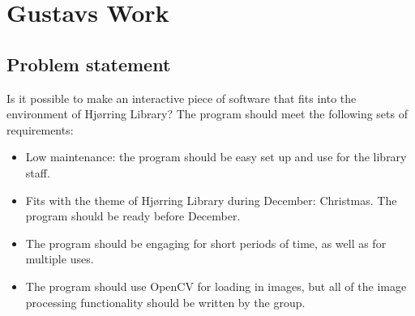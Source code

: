 \chapter{Gustavs Work}

\section{Problem statement}
Is it possible to make an interactive piece of software that fits into the environment of Hjørring Library? The program should meet the following sets of requirements:

\begin{itemize}
\item Low maintenance: the program should be easy set up and use for the library staff.
\item Fits with the theme of Hjørring Library during December: Christmas. The program should be ready before December.
\item The program should be engaging for short periods of time, as well as for multiple uses.
\item The program should use OpenCV for loading in images, but all of the image processing functionality should be written by the group.
\end{itemize}
